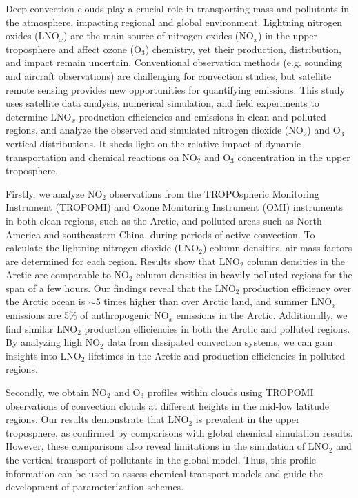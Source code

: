 {
Deep convection clouds play a crucial role in transporting mass and pollutants in the atmosphere, impacting regional and global environment.
Lightning nitrogen oxides (LNO$_x$) are the main source of nitrogen oxides (NO$_x$) in the upper troposphere
and affect ozone (O$_3$) chemistry, yet their production, distribution, and impact remain uncertain.
Conventional observation methods (e.g. sounding and aircraft observations) are challenging for convection studies,
but satellite remote sensing provides new opportunities for quantifying emissions.
This study uses satellite data analysis, numerical simulation, and field experiments to determine LNO$_x$ production efficiencies and emissions in clean and polluted regions,
and analyze the observed and simulated nitrogen dioxide (NO$_2$) and O$_3$ vertical distributions.
It sheds light on the relative impact of dynamic transportation and chemical reactions on NO$_2$ and O$_3$ concentration in the upper troposphere.

Firstly, we analyze NO$_2$ observations from the TROPOspheric Monitoring Instrument (TROPOMI) and
Ozone Monitoring Instrument (OMI) instruments in both clean regions, such as the Arctic, and polluted areas such as North America and southeastern China, during periods of active convection.
To calculate the lightning nitrogen dioxide (LNO$_2$) column densities, air mass factors are determined for each region.
Results show that LNO$_2$ column densities in the Arctic are comparable to NO$_2$ column densities in heavily polluted regions for the span of a few hours.
Our findings reveal that the LNO$_2$ production efficiency over the Arctic ocean is $\sim$5 times higher than over Arctic land, and summer LNO$_x$ emissions are 5\% of anthropogenic NO$_x$ emissions in the Arctic.
Additionally, we find similar LNO$_2$ production efficiencies in both the Arctic and polluted regions.
By analyzing high NO$_2$ data from dissipated convection systems, we can gain insights into LNO$_2$ lifetimes in the Arctic and production efficiencies in polluted regions.

Secondly, we obtain NO$_2$ and O$_3$ profiles within clouds using TROPOMI observations of convection clouds at different heights in the mid-low latitude regions.
Our results demonstrate that LNO$_2$ is prevalent in the upper troposphere, as confirmed by comparisons with global chemical simulation results.
However, these comparisons also reveal limitations in the simulation of LNO$_2$ and the vertical transport of pollutants in the global model.
Thus, this profile information can be used to assess chemical transport models and guide the development of parameterization schemes.

}
